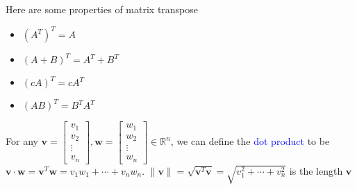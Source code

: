 \documentclass{beamer}
\theoremstyle{definition}
\theoremstyle{remark}
\begin{document}
\begin{frame}[t]
\begin{theorem}
Here are some properties of matrix transpose
\begin{itemize}
\item $(A^T)^T=A$\pause
\item $(A+B)^T=A^T+B^T$\pause
\item $(cA)^T=cA^T$\pause
\item $(AB)^T=B^TA^T$
\end{itemize}
\end{theorem}
\pause
\begin{definition}
For any $\mathbf v=\begin{bmatrix}
v_1\\v_2\\\vdots\\v_n
\end{bmatrix},\mathbf w=\begin{bmatrix}
w_1\\w_2\\\vdots\\w_n
\end{bmatrix}\in\mathbb R^n$, we can define the \textcolor{blue}{dot product} to be\pause $\mathbf v\cdot\mathbf w=\mathbf v^T\mathbf w=v_1w_1+\cdots+v_nw_n$\pause. $\|\mathbf v\|=\sqrt{\mathbf v^T\mathbf v}=\sqrt{v_1^2+\cdots+v_n^2}$ is the length $\mathbf v$
\end{definition}
\end{frame}
\end{document}
